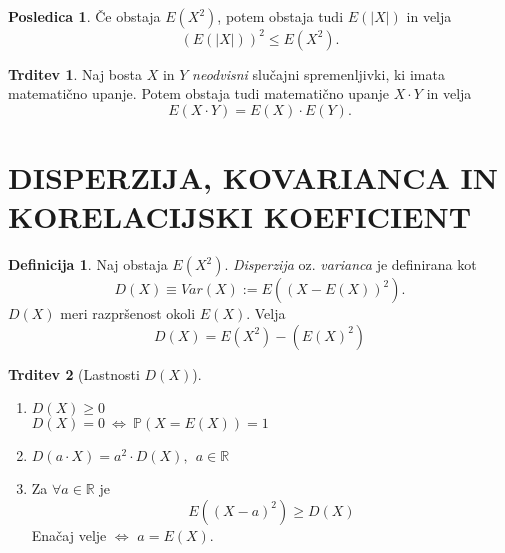 \documentclass[11pt]{article}
\theoremstyle{definition}
\newtheorem{definicija}{Definicija}[section]
\theoremstyle{definition}
\newtheorem{trditev}{Trditev}[section]
\theoremstyle{definition}
\newtheorem*{posledica}{Posledica}
\begin{document}
\begin{posledica}

Če obstaja $E(X^2)$, potem obstaja tudi $E(|X|)$ in velja
$$(E(|X|))^2 \leq E(X^2).$$

\end{posledica}
\vspace{0.5cm}

\begin{trditev}

Naj bosta $X$ in $Y$ \textit{neodvisni} slučajni spremenljivki, ki imata matematično upanje. Potem obstaja tudi matematično upanje $X \cdot Y$ in velja
$$E(X \cdot Y) = E(X) \cdot E(Y).$$

\end{trditev}
\vspace{0.5cm}

\pagebreak


\section{DISPERZIJA, KOVARIANCA IN KORELACIJSKI KOEFICIENT}
\vspace{0.5cm}

\begin{definicija}

Naj obstaja $E(X^2)$. \textit{Disperzija} oz. \textit{varianca} je definirana kot
$$D(X) \equiv Var(X) := E((X - E(X))^2).$$
$D(X)$ meri razpršenost okoli $E(X)$. Velja
$$D(X) = E(X^2) - (E(X)^2)$$

\end{definicija}
\vspace{0.5cm}

\begin{trditev}[Lastnosti $D(X)$]
~\\
\begin{enumerate}
	\item $D(X) \geq 0$ \\
	$D(X) = 0 ~\Leftrightarrow~ \mathbb{P}(X = E(X)) = 1$
	\item $D(a \cdot X) = a^2 \cdot D(X), ~~a \in \mathbb{R}$
	\item Za $\forall a \in \mathbb{R}$ je 
	$$E((X - a)^2) \geq D(X)$$
	Enačaj velje $\Leftrightarrow$ $a = E(X)$.
\end{enumerate}

\end{trditev}
\vspace{0.5cm}
\end{document}
